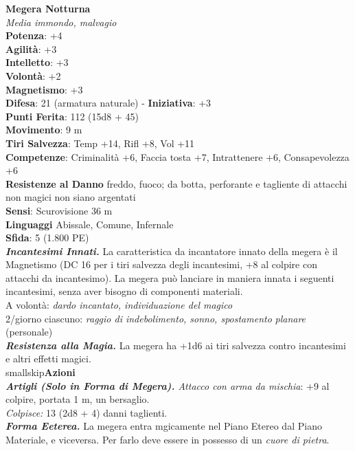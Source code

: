 \begin{multicols}{2}
\medskip\textbf{Megera Notturna}\\
\emph{Media immondo, malvagio}\\
\textbf{Potenza}: +4\\
\textbf{Agilità}: +3\\
\textbf{Intelletto}: +3\\
\textbf{Volontà}: +2\\
\textbf{Magnetismo}: +3\\
\textbf{Difesa}: 21 (armatura naturale) - \textbf{Iniziativa}: +3\\
\textbf{Punti Ferita}: 112 (15d8 + 45)\\
\textbf{Movimento}: 9 m\\
\textbf{Tiri Salvezza}: Temp +14, Rifl +8, Vol +11\\
\textbf{Competenze}: Criminalità +6, Faccia tosta +7, Intrattenere +6, Consapevolezza +6\\
\textbf{Resistenze al Danno} freddo, fuoco; da botta, perforante e tagliente di attacchi non magici non siano argentati\\
\textbf{Sensi}: Scurovisione 36 m\\
\textbf{Linguaggi} Abissale, Comune, Infernale\\
\textbf{Sfida}: 5 (1.800 PE)\smallskip\\

\emph{\textbf{Incantesimi Innati.}} La caratteristica da incantatore innato della megera è il Magnetismo (DC  16 per i tiri salvezza degli incantesimi, +8 al colpire con attacchi da incantesimo). La megera può lanciare in maniera innata i seguenti incantesimi, senza aver bisogno di componenti materiali.\\

A volontà: \emph{dardo incantato, individuazione del magico}\\
2/giorno ciascuno: \emph{raggio di indebolimento, sonno, spostamento} \emph{planare} (personale)\\
\emph{\textbf{Resistenza alla Magia.}} La megera ha +1d6 ai tiri salvezza contro incantesimi e altri effetti magici.\\
smallskip\textbf{Azioni}\\
\emph{\textbf{Artigli (Solo in Forma di Megera).} Attacco con arma da mischia}: +9 al colpire, portata 1 m, un bersaglio.\\
\emph{Colpisce:} 13 (2d8 + 4) danni taglienti.\\

\emph{\textbf{Forma Eeterea.}} La megera entra mgicamente nel Piano Etereo dal Piano Materiale, e viceversa. Per farlo deve essere in possesso di un \emph{cuore di pietra}.\\


\end{multicols}
